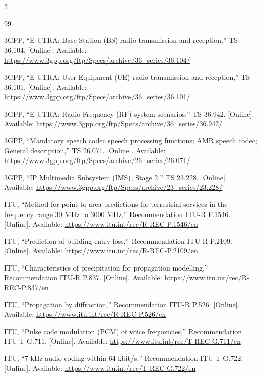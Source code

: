 \documentclass[9pt,a4paper]{extarticle}
\begin{document}
\renewcommand{\refname}{References}
\begin{multicols}{2}
\begin{thebibliography}{99}
\setlength{\itemsep}{0pt}
\footnotesize

 3GPP, ``E-UTRA: Base Station (BS) radio transmission and reception,'' TS 36.104.
[Online]. Available: \url{https://www.3gpp.org/ftp/Specs/archive/36_series/36.104/}

 3GPP, ``E-UTRA: User Equipment (UE) radio transmission and reception,''
TS 36.101. [Online]. Available:
\url{https://www.3gpp.org/ftp/Specs/archive/36_series/36.101/}

 3GPP, ``E-UTRA: Radio Frequency (RF) system scenarios,'' TS 36.942. [Online].
Available: \url{https://www.3gpp.org/ftp/Specs/archive/36_series/36.942/}

 3GPP, ``Mandatory speech codec speech processing functions; AMR speech codec;
General description,'' TS 26.071. [Online]. Available:
\url{https://www.3gpp.org/ftp/Specs/archive/26_series/26.071/}

 3GPP, ``IP Multimedia Subsystem (IMS); Stage 2,'' TS 23.228. [Online].
Available: \url{https://www.3gpp.org/ftp/Specs/archive/23_series/23.228/}

 ITU, ``Method for point-to-area predictions for terrestrial services in the
frequency range 30 MHz to 3000 MHz,'' Recommendation ITU-R P.1546. [Online]. Available:
\url{https://www.itu.int/rec/R-REC-P.1546/en}

 ITU, ``Prediction of building entry loss,'' Recommendation ITU-R P.2109.
[Online]. Available: \url{https://www.itu.int/rec/R-REC-P.2109/en}

 ITU, ``Characteristics of precipitation for propagation modelling,''
Recommendation ITU-R P.837. [Online]. Available:
\url{https://www.itu.int/rec/R-REC-P.837/en}

 ITU, ``Propagation by diffraction,'' Recommendation ITU-R P.526. [Online].
Available: \url{https://www.itu.int/rec/R-REC-P.526/en}

 ITU, ``Pulse code modulation (PCM) of voice frequencies,'' Recommendation
ITU-T G.711. [Online]. Available: \url{https://www.itu.int/rec/T-REC-G.711/en}

 ITU, ``7 kHz audio-coding within 64 kbit/s,'' Recommendation ITU-T G.722.
[Online]. Available: \url{https://www.itu.int/rec/T-REC-G.722/en}


\end{thebibliography}
\end{multicols}
\end{document}
